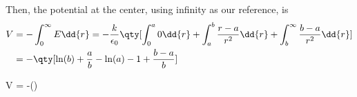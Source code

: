 \documentclass[12pt,a4paper]{article}
\begin{document}
Then, the potential at the center, using infinity as our reference, is
\begin{align*}
V &= -\int_{0}^{\infty} E \dd{r} = -\frac{k}{\epsilon_0}\qty[ \int_{0}^{a} 0\dd{r} + \int_{a}^{b} \frac{r-a}{r^2} \dd{r} + \int_{b}^{\infty} \frac{b-a}{r^2} \dd{r}] \\
&= -\qty[\ln(b) + \frac{a}{b} - \ln(a) - 1 + \frac{b-a}{b}]
\end{align*}
\begin{eqbox}
V = -\ln()
\end{eqbox}
\end{document}
